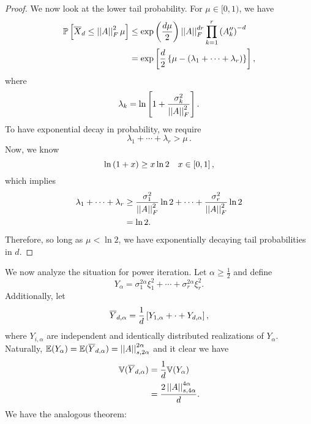 \begin{proof}
We now look at the lower tail probability.
For $\mu\in[0,1)$, we have
%
\begin{align}
    \mathbb{P}\left[ \overline{X}_{d}\le \left| \left| A \right| \right|_{F}^{2}\mu \right]
        &\le \exp\left( \frac{d\mu}{2} \right) \left| \left| A \right| \right|_{F}^{dr}
            \prod_{k=1}^{r}\left( A_{k}'' \right)^{-d} \nonumber\\
        &= \exp\left[ \frac{d}{2}\left\{ \mu - \left( \lambda_{1}
            + \cdots + \lambda_{r} \right) \right\} \right],
\end{align}
%
where
%
\begin{equation}
    \lambda_{k} = \ln\left[ 1 + \frac{\sigma_{k}^{2}}{\left| \left| A \right| \right|_{F}^{2}} \right].
\end{equation}
%
To have exponential decay in probability, we require
%
\begin{equation}
    \lambda_{1} + \cdots + \lambda_{r} > \mu \, .
\end{equation}
%
Now, we know
%
\begin{equation}
    \ln\left( 1 + x \right) \ge x\ln 2 \quad x\in\left[ 0,1 \right],
\end{equation}
%
which implies
%
\begin{align}
    \lambda_{1} + \cdots + \lambda_{r}
        &\ge \frac{\sigma_{1}^{2}}{\left| \left| A \right| \right|_{F}^{2}}\ln2
            + \cdots + \frac{\sigma_{r}^{2}}{\left| \left| A \right| \right|_{F}^{2}}\ln2 \nonumber\\
        &= \ln 2.
\end{align}
%
Therefore, so long as $\mu<\ln2$, we have exponentially decaying tail
probabilities in $d$.

\end{proof}



We now analyze the situation for power iteration.
Let $\alpha\ge\frac{1}{2}$ and define
%
\begin{equation}
    Y_{\alpha} = \sigma_{1}^{2\alpha}\xi_{1}^{2} + \cdots +
        \sigma_{r}^{2\alpha}\xi_{r}^{2}.
\end{equation}
%
Additionally, let
%
\begin{equation}
    \overline{Y}_{d,\alpha} = \frac{1}{d}\left[ Y_{1,\alpha} + \cdot
        + Y_{d,\alpha} \right],
    \label{eq:rand_averaged_power_RV}
\end{equation}
%
where $Y_{i,\alpha}$ are independent and identically distributed realizations
of $Y_{\alpha}$.
Naturally, $\mathbb{E}(Y_{\alpha}) = \mathbb{E}(\overline{Y}_{d,\alpha}) =
\left| \left| A \right| \right|_{s,2\alpha}^{2\alpha}$
and it clear we have
%
\begin{align}
    \mathbb{V}(\overline{Y}_{d,\alpha}) &= \frac{1}{d}\mathbb{V}(Y_{\alpha}) \nonumber\\
        &= \frac{2\left| \left| A \right| \right|_{s,4\alpha}^{4\alpha}}{d}.
\end{align}
%
We have the analogous theorem:

